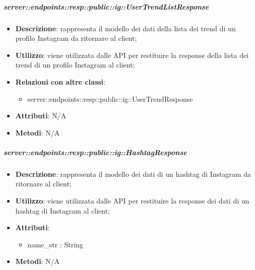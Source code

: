     \subparagraph{server::endpoints::resp::public::ig::UserTrendListResponse} %
    \label{subp:bdsm_app_server_endpoints_resp_public_ig_usertrendlistresponse}
    \begin{itemize}
      \item \textbf{Descrizione}: rappresenta il modello dei dati della lista dei trend di un profilo Instagram da ritornare al client;
      \item \textbf{Utilizzo}: viene utilizzata dalle API per restituire la response della lista dei trend di un profilo Instagram al client;
      \item \textbf{Relazioni con altre classi}:
        \begin{itemize}
          \item server::endpoints::resp::public::ig::UserTrendResponse
        \end{itemize}
	  \item \textbf{Attributi}: N/A
	  \item \textbf{Metodi}: N/A
      \end{itemize}

    \subparagraph{server::endpoints::resp::public::ig::HashtagResponse} %
    \label{subp:bdsm_app_server_endpoints_resp_public_ig_hashtagresponse}
    \begin{itemize}
      \item \textbf{Descrizione}: rappresenta il modello dei dati di un hashtag di Instagram da ritornare al client;
      \item \textbf{Utilizzo}: viene utilizzata dalle API per restituire la response dei dati di un hashtag di Instagram al client;
      
	  \item \textbf{Attributi}:  
	  	\begin{itemize}
	  		\item name\_str : String
	  	\end{itemize}
	  \item \textbf{Metodi}: N/A
      \end{itemize}

